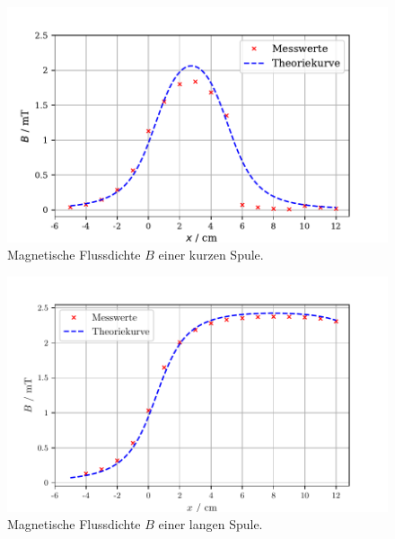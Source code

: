\begin{figure}[H]
  \centering
  \includegraphics{kurz.pdf}
  \caption{Magnetische Flussdichte $B$ einer kurzen Spule.}
  \label{fig:plot}
\end{figure}



\begin{figure}[H]
  \centering
  \includegraphics{lang.pdf}
  \caption{Magnetische Flussdichte $B$ einer langen Spule.}
  \label{fig:plot}
\end{figure}




